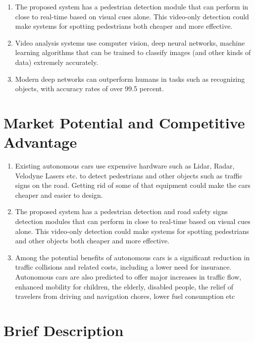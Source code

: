 \documentclass[12pt,a4paper,final]{article}
\begin{document}
\begin{flushleft}
\begin{enumerate}
\item
The proposed system has a pedestrian detection module that can perform in close to real-time based on visual cues alone. This video-only detection could make systems for spotting pedestrians both cheaper and more effective.
\item
Video analysis systems use computer vision, deep neural networks, machine learning algorithms that can be trained to classify images (and other kinds of data) extremely accurately. 
\item
 Modern deep networks can outperform humans in tasks such as recognizing objects, with accuracy rates of over 99.5 percent.


\end{enumerate}

\noindent
\section{Market Potential and Competitive Advantage}
\begin{enumerate}
\item
Existing autonomous cars use expensive hardware such as Lidar, Radar, Velodyne Lasers etc. to detect pedestrians and other objects such as traffic signs on the road. Getting rid of some of that equipment could make the cars cheaper and easier to design.
\item
The proposed system has a pedestrian detection and road safety signs detection modules that can perform in close to real-time based on visual cues alone. This video-only detection could make systems for spotting pedestrians and other objects both cheaper and more effective.


\item
Among the potential benefits of autonomous cars is a significant reduction in traffic collisions and related costs, including a lower need for insurance. Autonomous cars are also predicted to offer major increases in traffic flow, enhanced mobility for children, the elderly, disabled people, the relief of travelers from driving and navigation chores, lower fuel consumption etc

\end{enumerate}

\noindent
\section{Brief Description}


\end{flushleft}
\end{document}
